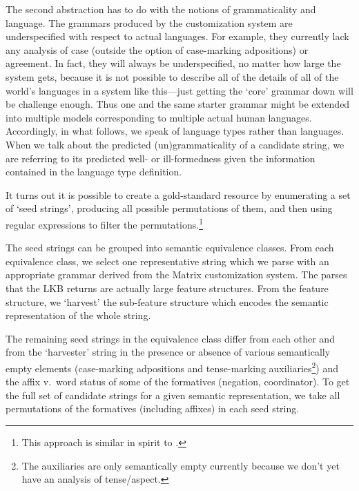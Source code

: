 \documentclass[11pt]{article}
\begin{document}
The second abstraction has to do with the notions of grammaticality
and language.  The grammars produced by the customization system are
underspecified with respect to actual languages.  For example, they
currently lack any analysis of case (outside the option of
case-marking adpositions) or agreement.  In fact, they will always be
underspecified, no matter how large the system gets, because it is not
possible to describe all of the details of all of the world's
languages in a system like this---just getting the `core' grammar down
will be challenge enough.  Thus one and the same starter grammar might
be extended into multiple models corresponding to multiple actual
human languages.  Accordingly, in what follows, we speak of language
types rather than languages.  When we talk about the predicted
(un)grammaticality of a candidate string, we are referring to its
predicted well- or ill-formedness given the information contained
in the language type definition.


It turns out it is possible 
to create a
gold-standard resource by enumerating a set of `seed strings',
producing all possible permutations of them, and then using regular
expressions to filter the permutations.\footnote{This approach is
similar in spirit to \cite{Arnold*94}.}  

The seed strings can be grouped into semantic equivalence classes.
From each equivalence class, we select one representative string which
we parse with an appropriate grammar derived from the Matrix
customization system.  The parses that the LKB returns are actually
large feature structures.  From the feature structure, we `harvest' the
sub-feature structure which encodes the semantic representation of the
whole string.

The remaining seed strings in the equivalence class differ from each
other and from the `harvester' string in the presence or absence of
various semantically empty elements (case-marking adpositions and
tense-marking auxiliaries\footnote{The auxiliaries are only
semantically empty currently because we don't yet have an analysis of
tense/aspect.})  and the affix v.\ word status of some of the
formatives (negation, coordinator).  To get the full set of candidate
strings for a given semantic representation, we take all permutations
of the formatives (including affixes) in each seed string.
\end{document}
